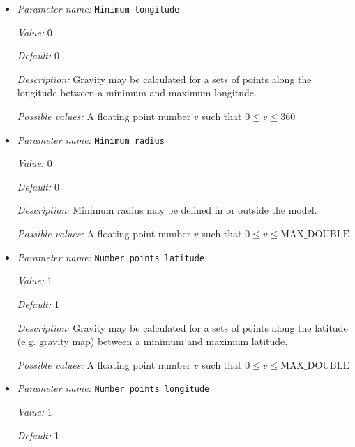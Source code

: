 \begin{itemize}
{\it Possible values:} A floating point number $v$ such that $0 \leq v \leq 180$
\item {\it Parameter name:} {\tt Minimum longitude}
\label{parameters:Postprocess/Gravity calculation/Minimum longitude}


{\it Value:} 0


{\it Default:} 0


{\it Description:} Gravity may be calculated for a sets of points along the longitude between a minimum and maximum longitude.


{\it Possible values:} A floating point number $v$ such that $0 \leq v \leq 360$
\item {\it Parameter name:} {\tt Minimum radius}
\label{parameters:Postprocess/Gravity calculation/Minimum radius}


{\it Value:} 0


{\it Default:} 0


{\it Description:} Minimum radius may be defined in or outside the model.


{\it Possible values:} A floating point number $v$ such that $0 \leq v \leq \text{MAX\_DOUBLE}$
\item {\it Parameter name:} {\tt Number points latitude}
\label{parameters:Postprocess/Gravity calculation/Number points latitude}


{\it Value:} 1


{\it Default:} 1


{\it Description:} Gravity may be calculated for a sets of points along the latitude (e.g. gravity map) between a minimum and maximum latitude.


{\it Possible values:} A floating point number $v$ such that $0 \leq v \leq \text{MAX\_DOUBLE}$
\item {\it Parameter name:} {\tt Number points longitude}
\label{parameters:Postprocess/Gravity calculation/Number points longitude}


{\it Value:} 1


{\it Default:} 1



\end{itemize}
